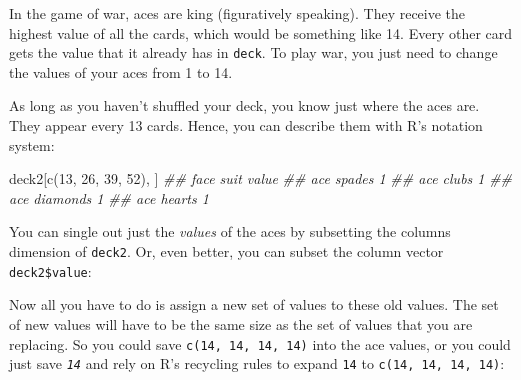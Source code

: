 \documentclass[
  letterpaper,
  DIV=11,
  numbers=noendperiod]{scrbook}
\newenvironment{Shaded}{\begin{snugshade}}{\end{snugshade}}
\newcommand{\DecValTok}[1]{\textcolor[rgb]{0.68,0.00,0.00}{#1}}
\newcommand{\DocumentationTok}[1]{\textcolor[rgb]{0.37,0.37,0.37}{\textit{#1}}}
\newcommand{\FunctionTok}[1]{\textcolor[rgb]{0.28,0.35,0.67}{#1}}
\newcommand{\NormalTok}[1]{\textcolor[rgb]{0.00,0.23,0.31}{#1}}
\newcommand{\SpecialCharTok}[1]{\textcolor[rgb]{0.37,0.37,0.37}{#1}}
\begin{document}
In the game of war, aces are king (figuratively speaking). They receive
the highest value of all the cards, which would be something like 14.
Every other card gets the value that it already has in \texttt{deck}. To
play war, you just need to change the values of your aces from 1 to 14.

As long as you haven't shuffled your deck, you know just where the aces
are. They appear every 13 cards. Hence, you can describe them with R's
notation system:

\begin{Shaded}
\begin{Highlighting}[]
\NormalTok{deck2[}\FunctionTok{c}\NormalTok{(}\DecValTok{13}\NormalTok{, }\DecValTok{26}\NormalTok{, }\DecValTok{39}\NormalTok{, }\DecValTok{52}\NormalTok{), ]}
\DocumentationTok{\#\#  face     suit value}
\DocumentationTok{\#\#   ace   spades     1}
\DocumentationTok{\#\#   ace    clubs     1}
\DocumentationTok{\#\#   ace diamonds     1}
\DocumentationTok{\#\#   ace   hearts     1}
\end{Highlighting}
\end{Shaded}

You can single out just the \emph{values} of the aces by subsetting the
columns dimension of \texttt{deck2}. Or, even better, you can subset the
column vector \texttt{deck2\$value}:

\begin{Shaded}
\end{Shaded}

Now all you have to do is assign a new set of values to these old
values. The set of new values will have to be the same size as the set
of values that you are replacing. So you could save
\texttt{c(14,\ 14,\ 14,\ 14)} into the ace values, or you could just
save \emph{\texttt{14}} and rely on R's recycling rules to expand
\texttt{14} to \texttt{c(14,\ 14,\ 14,\ 14)}:
\end{document}
